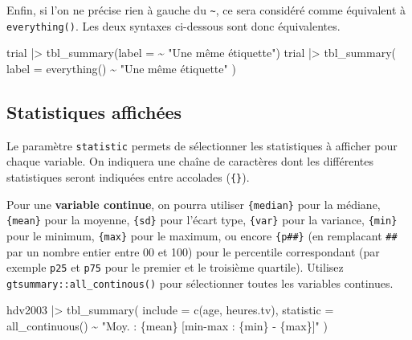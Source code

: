 \documentclass[
  letterpaper,
  DIV=11,
  numbers=noendperiod,
  oneside]{scrreprt}
\newenvironment{Shaded}{\begin{snugshade}}{\end{snugshade}}
\newcommand{\AttributeTok}[1]{\textcolor[rgb]{0.40,0.45,0.13}{#1}}
\newcommand{\FunctionTok}[1]{\textcolor[rgb]{0.28,0.35,0.67}{#1}}
\newcommand{\NormalTok}[1]{\textcolor[rgb]{0.00,0.23,0.31}{#1}}
\newcommand{\SpecialCharTok}[1]{\textcolor[rgb]{0.37,0.37,0.37}{#1}}
\newcommand{\StringTok}[1]{\textcolor[rgb]{0.13,0.47,0.30}{#1}}
\begin{document}
\begin{tcolorbox}
Enfin, si l'on ne précise rien à gauche du \texttt{\textasciitilde{}},
ce sera considéré comme équivalent à \texttt{everything()}. Les deux
syntaxes ci-dessous sont donc équivalentes.

\begin{Shaded}
\begin{Highlighting}[]
\NormalTok{trial }\SpecialCharTok{|\textgreater{}} 
  \FunctionTok{tbl\_summary}\NormalTok{(}\AttributeTok{label =} \SpecialCharTok{\textasciitilde{}} \StringTok{"Une même étiquette"}\NormalTok{)}
\NormalTok{trial }\SpecialCharTok{|\textgreater{}} 
  \FunctionTok{tbl\_summary}\NormalTok{(}
    \AttributeTok{label =} \FunctionTok{everything}\NormalTok{() }\SpecialCharTok{\textasciitilde{}} \StringTok{"Une même étiquette"}
\NormalTok{  )}
\end{Highlighting}
\end{Shaded}

\end{tcolorbox}

\hypertarget{statistiques-affichuxe9es}{%
\subsection{Statistiques affichées}\label{statistiques-affichuxe9es}}

Le paramètre \texttt{statistic} permets de sélectionner les statistiques
à afficher pour chaque variable. On indiquera une chaîne de caractères
dont les différentes statistiques seront indiquées entre accolades
(\texttt{\{\}}).

Pour une \textbf{variable continue}, on pourra utiliser
\texttt{\{median\}} pour la médiane, \texttt{\{mean\}} pour la moyenne,
\texttt{\{sd\}} pour l'écart type, \texttt{\{var\}} pour la variance,
\texttt{\{min\}} pour le minimum, \texttt{\{max\}} pour le maximum, ou
encore \texttt{\{p\#\#\}} (en remplacant \texttt{\#\#} par un nombre
entier entre 00 et 100) pour le percentile correspondant (par exemple
\texttt{p25} et \texttt{p75} pour le premier et le troisième quartile).
Utilisez \texttt{gtsummary::all\_continous()} pour sélectionner toutes
les variables continues.

\begin{Shaded}
\begin{Highlighting}[]
\NormalTok{hdv2003 }\SpecialCharTok{|\textgreater{}}
  \FunctionTok{tbl\_summary}\NormalTok{(}
    \AttributeTok{include =} \FunctionTok{c}\NormalTok{(age, heures.tv),}
    \AttributeTok{statistic =} 
      \FunctionTok{all\_continuous}\NormalTok{() }\SpecialCharTok{\textasciitilde{}} \StringTok{"Moy. : \{mean\} [min{-}max : \{min\} {-} \{max\}]"}
\NormalTok{  )}
\end{Highlighting}
\end{Shaded}
\end{document}
